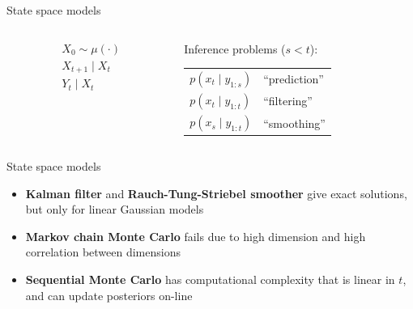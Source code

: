 \documentclass[aspectratio=169]{beamer}
\theoremstyle{definition}
\begin{document}
\begin{frame}{State space models}
\begin{columns}
\begin{column}{0.45\textwidth}
\begin{center}
\end{center}
\begin{align*}
& X_0 \sim \mu(\cdot) \\
& X_{t+1} \mid X_t \\ %
& Y_t \mid X_t %
\end{align*}
\end{column}
\begin{column}{0.45\textwidth}
\pause
Inference problems ($s<t$):

\renewcommand{\arraystretch}{1.5}
\begin{tabular}{l l}
$p(x_{t} \mid y_{1:s})$ & ``prediction'' \\
$p(x_{t} \mid y_{1:t})$ & ``filtering'' \\
$p(x_{s} \mid y_{1:t})$ & ``smoothing''
\end{tabular}
\end{column}
\end{columns}

\end{frame}

\begin{frame}{State space models}
\begin{itemize}[<+->]
\item \textbf{Kalman filter} and \textbf{Rauch-Tung-Striebel smoother} give exact solutions, but only for linear Gaussian models
\item \textbf{Markov chain Monte Carlo} fails due to high dimension and high correlation between dimensions
\item \textbf{Sequential Monte Carlo} has computational complexity that is linear in $t$, and can update posteriors on-line
\end{itemize}
\end{frame}
\end{document}

